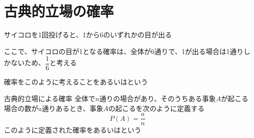\documentclass[../../../topic_probability-statistics]{subfiles}
\begin{document}
\sectionline
\section{古典的立場の確率}

サイコロを1回投げると、1から6のいずれかの目が出る

\br

ここで、サイコロの目が1となる確率は、全体が6通りで、1が出る場合は1通りしかないため、$\dfrac{1}{6}$と考える

\br

確率をこのように考えることをあるいはという

\begin{definition}{古典的立場による確率}
  全体で$n$通りの場合があり、そのうちある事象$A$が起こる場合の数が$a$通りあるとき、事象$A$の起こるを次のように定義する
  \begin{equation*}
    P(A) = \frac{a}{n}
  \end{equation*}
  このように定義された確率をあるいはという
\end{definition}
\end{document}
